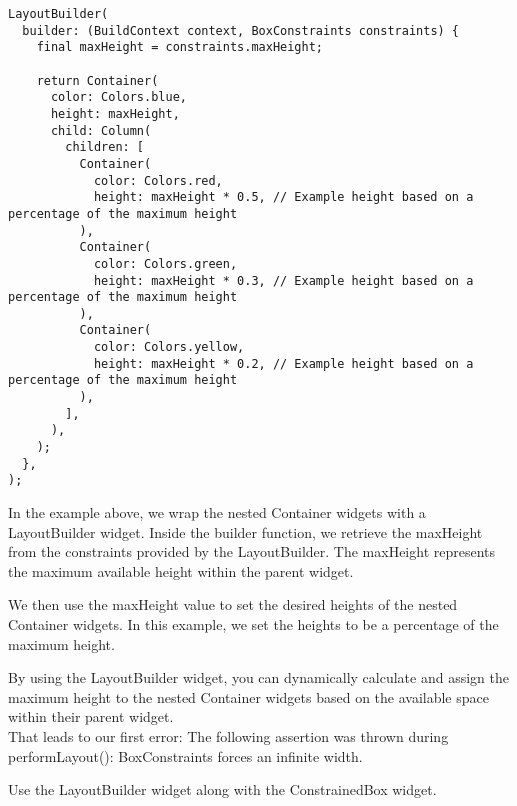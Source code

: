 \begin{lstlisting}
LayoutBuilder(
  builder: (BuildContext context, BoxConstraints constraints) {
    final maxHeight = constraints.maxHeight;

    return Container(
      color: Colors.blue,
      height: maxHeight,
      child: Column(
        children: [
          Container(
            color: Colors.red,
            height: maxHeight * 0.5, // Example height based on a percentage of the maximum height
          ),
          Container(
            color: Colors.green,
            height: maxHeight * 0.3, // Example height based on a percentage of the maximum height
          ),
          Container(
            color: Colors.yellow,
            height: maxHeight * 0.2, // Example height based on a percentage of the maximum height
          ),
        ],
      ),
    );
  },
);
\end{lstlisting}

In the example above, we wrap the nested Container widgets with a LayoutBuilder widget. Inside the builder function, 
we retrieve the maxHeight from the constraints provided by the LayoutBuilder. The maxHeight represents the 
maximum available height within the parent widget.

We then use the maxHeight value to set the desired heights of the nested Container widgets. In this example, 
we set the heights to be a percentage of the maximum height.

By using the LayoutBuilder widget, you can dynamically calculate and assign the maximum height to the nested 
Container widgets based on the available space within their parent widget.
\\
That leads to our first error: The following assertion was thrown during performLayout(): 
BoxConstraints forces an infinite width.

Use the LayoutBuilder widget along with the ConstrainedBox widget.

